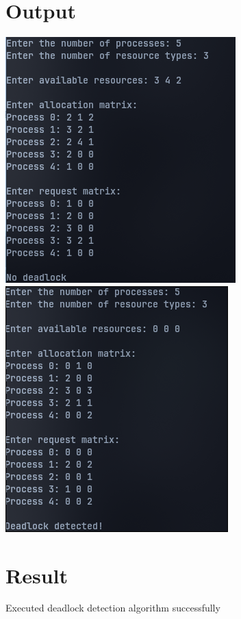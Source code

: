 \section{Output}
\includegraphics[]{Cycle_4//Outputs/deadlock.png}
\newpage
\includegraphics[]{Cycle_4//Outputs/deadklock1.png}



\section{Result}
Executed deadlock detection algorithm successfully
